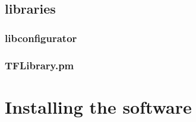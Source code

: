\documentclass[11pt,a4paper,openany,oneside]{book}
\begin{document}






\section{libraries}

\subsection{libconfigurator}

\subsection{TFLibrary.pm}





\chapter{Installing the software}


% 
\end{document}
